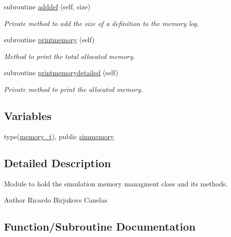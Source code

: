 \begin{DoxyCompactItemize}
subroutine \hyperlink{namespacesimulation__memory__mod_ac6d6853bc462947d24a8f6234d625138}{adddef} (self, size)
\begin{DoxyCompactList}\small\item\em Private method to add the size of a definition to the memory log. \end{DoxyCompactList}\item 
subroutine \hyperlink{namespacesimulation__memory__mod_a16a7a1c7e88fe5a5523d23f83f0e04a0}{printmemory} (self)
\begin{DoxyCompactList}\small\item\em Method to print the total allocated memory. \end{DoxyCompactList}\item 
subroutine \hyperlink{namespacesimulation__memory__mod_a894bd4ec7462fd634d328ee5be4c6483}{printmemorydetailed} (self)
\begin{DoxyCompactList}\small\item\em Private method to print the allocated memory. \end{DoxyCompactList}\end{DoxyCompactItemize}
\subsection*{Variables}
\begin{DoxyCompactItemize}
\item 
type(\hyperlink{structsimulation__memory__mod_1_1memory__t}{memory\+\_\+t}), public \hyperlink{namespacesimulation__memory__mod_af3e2714796469b4b1ec247569b184088}{simmemory}
\end{DoxyCompactItemize}


\subsection{Detailed Description}
Module to hold the simulation memory managment class and its methods. 

\begin{DoxyAuthor}{Author}
Ricardo Birjukovs Canelas 
\end{DoxyAuthor}


\subsection{Function/\+Subroutine Documentation}
\mbox{\label{namespacesimulation__memory__mod_a4169689db37b3ba35e092096a7019f80}} 
